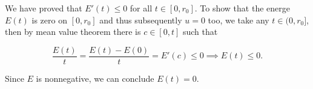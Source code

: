 \documentclass{article}
\begin{document}
\begin{enumerate}
\begin{enumerate}
\begin{solution}
            We have proved that $E'(t)\leq 0$ for all $t\in [0, r_0]$.
            To show that the energe $E(t)$ is zero on $[0, r_0]$ and thus subsequently $u=0$ too, we take any $t\in (0,r_0]$,
            then by mean value theorem there is $c\in[0,t]$ such that

            $$\dfrac{E(t)}{t} = \dfrac{E(t)-E(0)}{t} = E'(c)\leq 0 \implies E(t)\leq 0.$$

            Since $E$ is nonnegative, we can conclude $E(t)=0$.

        \end{solution}
    \end{enumerate}
\end{enumerate}
\end{document}
